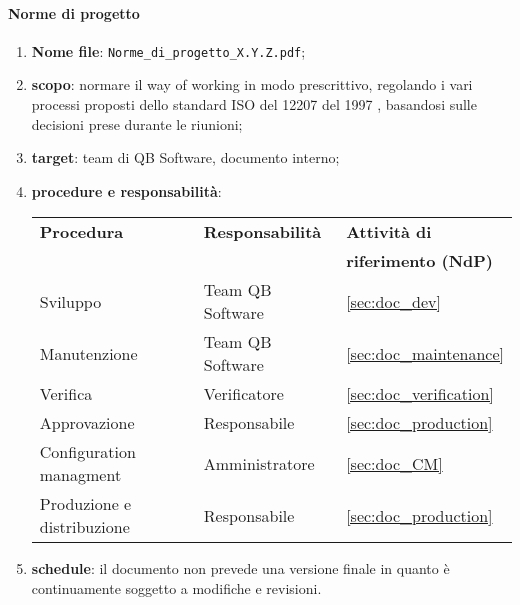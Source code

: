         \paragraph{Norme di progetto}
            \begin{enumerate}
                \item \textbf{Nome file}: \texttt{Norme\_di\_progetto\_X.Y.Z.pdf};
                \item \textbf{scopo}: normare il way of working in modo prescrittivo, regolando i vari processi proposti dello standard ISO del 12207 del 1997 \cite{bib:ISO12207_1997}, basandosi sulle decisioni prese durante le riunioni;
                \item \textbf{target}: team di QB Software, documento interno;
                \item \textbf{procedure e responsabilità}:
                \\
                \begin{tabularx}{0.93\textwidth}{|X|X|X|}
                    \hline
                    \textbf{Procedura} & \textbf{Responsabilità} & \textbf{Attività di} \\
                    & & \textbf{riferimento (NdP)} \\
                    \hline
                    Sviluppo & Team QB Software &  \ref{sec:doc_dev}
                    \\\hline
                    Manutenzione & Team QB Software & \ref{sec:doc_maintenance} 
                    \\\hline
                    Verifica & Verificatore & \ref{sec:doc_verification}
                    \\\hline
                    Approvazione & Responsabile & \ref{sec:doc_production}
                    \\\hline
                    Configuration managment & Amministratore & \ref{sec:doc_CM}
                    \\\hline
                    Produzione e distribuzione & Responsabile & \ref{sec:doc_production}
                    \\\hline
                \end{tabularx}
                \item \textbf{schedule}: il documento non prevede una versione finale in quanto è continuamente soggetto a modifiche e revisioni. 
            \end{enumerate}
            
